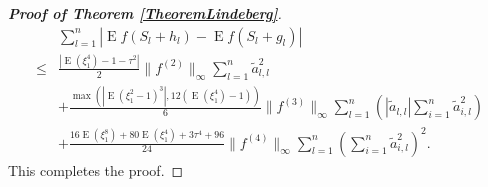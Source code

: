 \documentclass[bj]{imsart}
\DeclareMathOperator{\myE}{E}
\theoremstyle{plain}
\theoremstyle{definition}
\theoremstyle{remark}
\begin{document}
\begin{proof}[\textbf{Proof of Theorem \ref{TheoremLindeberg}}]
    \begin{equation*}
        \begin{split}
             &
             \sum_{l=1}^n \left| \myE f(S_{l}+h_{l})-\myE f(S_{l}+g_{l})\right|
             \\
\leq&
\frac{
\left|
\myE (\xi_1^4)-1
            -
            \tau^2
\right|
}{2}
\|f^{(2)}\|_\infty
\sum_{l=1}^n \tilde a_{l,l}^2
\\
            &+
            \frac{
            \max\left(
    \left|\myE (\xi_1^2-1)^3\right|
            ,
12 (\myE (\xi_1^4)-1)
        \right)
            }{6} \|f^{(3)}\|_\infty
            \sum_{l=1}^n 
            \left(|\tilde a_{l,l}|
         \sum_{i=1}^{n} \tilde a_{i,l}^2 
     \right)
         \\
            &+
            \frac{
             16 \myE (\xi_1^8) + 80 \myE (\xi_1^4) + 3\tau^4 + 96 
            }{24} \|f^{(4)} \|_{\infty} 
            \sum_{l=1}^n \left( \sum_{i=1}^n \tilde a_{i,l}^2 \right)^2
            .
        \end{split}
    \end{equation*}
    This completes the proof.
 
\end{proof}
\end{document}
